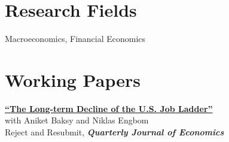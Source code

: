 \documentclass[margin,line]{res}                          %
\newenvironment{list1}{
	\begin{list}{\ding{113}}{%
			\setlength{\itemsep}{0in}
			\setlength{\parsep}{0in} \setlength{\parskip}{0in}
			\setlength{\topsep}{0in} \setlength{\partopsep}{0in}
			\setlength{\leftmargin}{0.17in}}}{\end{list}}
\begin{document}
\begin{resume}
		
		\section{\sc Research Fields}%
	\begin{list1}
		\item[] Macroeconomics, Financial Economics
	\end{list1}
	
	\section{\sc Working Papers}
	\begin{list1}
		
		\item[] \href{https://danicaratelli.github.io/research/papers/The_Long_term_Decline_of_the_US_Job_Ladder.pdf}{\textbf{{\color{darkblue}``The Long-term Decline of the U.S. Job Ladder''}}}\\ 
		with Aniket Baksy and Niklas Engbom\smallskip\\
		Reject and Resubmit, \textit{\textbf{Quarterly Journal of Economics}}
		

\end{list1}
\end{resume}
\end{document}
